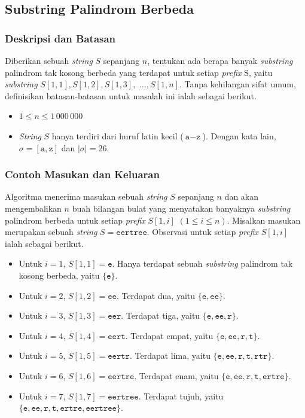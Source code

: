 \documentclass[11pt, a4paper, final]{article}
\begin{document}
\subsection{Substring Palindrom Berbeda}
\subsubsection{Deskripsi dan Batasan}
Diberikan sebuah \textit{string} $S$ sepanjang $n$, tentukan ada berapa banyak \textit{substring} palindrom tak kosong berbeda yang terdapat untuk setiap \textit{prefix} S, yaitu \textit{substring} $S[1, 1], S[1, 2], S[1, 3],$ $\dots, S[1, n]$. Tanpa kehilangan sifat umum, definisikan batasan-batasan untuk masalah ini ialah sebagai berikut.

\begin{itemize}
  \setlength\itemsep{-0.5em}
  \item $1 \leq n \leq 1\,000\,000$
  \item \textit{String} $S$ hanya terdiri dari huruf latin kecil ($\texttt{a}-\texttt{z}$). Dengan kata lain, $\sigma = [\texttt{a},\texttt{z}]$ dan $|\sigma| = 26$.
\end{itemize}

\subsubsection{Contoh Masukan dan Keluaran}

Algoritma menerima masukan sebuah \textit{string} $S$ sepanjang $n$ dan akan mengembalikan $n$ buah bilangan bulat yang menyatakan banyaknya \textit{substring} palindrom berbeda untuk setiap \textit{prefix} $S[1, i]$ $(1 \leq i \leq n)$. Misalkan masukan merupakan sebuah \textit{string} $S = \texttt{eertree}$. Observasi untuk setiap \textit{prefix} $S[1, i]$ ialah sebagai berikut.

\begin{itemize}
  \setlength\itemsep{-0.5em}
  \item Untuk $i = 1$, $S[1, 1] = \texttt{e}$. Hanya terdapat sebuah \textit{substring} palindrom tak kosong berbeda, yaitu $\{\texttt{e}\}$.
  \item Untuk $i = 2$, $S[1, 2] = \texttt{ee}$. Terdapat dua, yaitu $\{\texttt{e}, \texttt{ee}\}$.
  \item Untuk $i = 3$, $S[1, 3] = \texttt{eer}$. Terdapat tiga, yaitu $\{\texttt{e}, \texttt{ee}, \texttt{r}\}$.
  \item Untuk $i = 4$, $S[1, 4] = \texttt{eert}$. Terdapat empat, yaitu $\{\texttt{e}, \texttt{ee}, \texttt{r}, \texttt{t}\}$.
  \item Untuk $i = 5$, $S[1, 5] = \texttt{eertr}$. Terdapat lima, yaitu $\{\texttt{e}, \texttt{ee}, \texttt{r}, \texttt{t}, \texttt{rtr}\}$.
  \item Untuk $i = 6$, $S[1, 6] = \texttt{eertre}$. Terdapat enam, yaitu $\{\texttt{e}, \texttt{ee}, \texttt{r}, \texttt{t}, \texttt{ertre}\}$.
  \item Untuk $i = 7$, $S[1, 7] = \texttt{eertree}$. Terdapat tujuh, yaitu $\{\texttt{e}, \texttt{ee}, \texttt{r}, \texttt{t}, \texttt{ertre}, \texttt{eertree}\}$.
\end{itemize}
\end{document}
